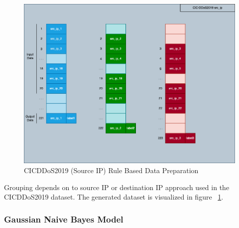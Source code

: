 \documentclass{article}
\begin{document}
\begin{figure}
  \centering
  \includegraphics[width=\textwidth]{cicddos2019_rule_based.png}
  \caption{CICDDoS2019 (Source IP) Rule Based Data Preparation}
  \label{cicddos2019-rule-based}
\end{figure}

Grouping depends on to source IP or destination IP approach used in the CICDDoS2019 dataset. The generated dataset is visualized in figure ~\ref{cicddos2019-rule-based}.
 

\subsubsection{Gaussian Naive Bayes Model}
\end{document}
